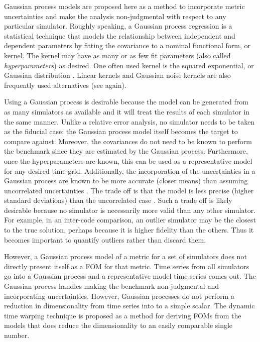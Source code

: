 \documentclass{ntmanuscript}
\begin{document}
Gaussian process models are proposed here as a method to incorporate
metric uncertainties and make the analysis non-judgmental with respect to
any particular
simulator. Roughly speaking, a Gaussian process regression is a
statistical technique
that models the relationship between independent and dependent parameters
by fitting the covariance to a nominal functional form, or kernel.
The kernel may have as many or as few fit parameters (also called
\emph{hyperparameters}) as desired. One often used kernel is the squared
exponential, or Gaussian distribution \cite{rasmussen2006gaussian,hodlr}.
Linear kernels and Gaussian noise kernels are also frequently used
alternatives (see \cite{rasmussen2006gaussian,hodlr} again).

Using a Gaussian process is desirable because the model can be generated
from as many simulators as available and it will treat the results of
each simulator in the same manner. Unlike a relative error analysis, no
simulator needs to be taken as the fiducial case; the Gaussian process model
itself becomes the target to compare against.
Moreover, the covariances do not need to be known to perform the benchmark
since they are estimated by the Gaussian process. Furthermore, once the
hyperparameters are known, this can be used as a representative model for
any desired time grid. Additionally, the incorporation of the uncertainties
in a Gaussian process are known to be more accurate (closer means) than
assuming uncorrelated uncertainties \cite{rasmussen1996evaluation,ko2009gp}.
The trade off is that the model is less precise (higher standard deviations)
than the uncorrelated case \cite{hodlr}. Such a trade off is likely
desirable because no simulator
is necessarily more valid than any other simulator. For example,
in an inter-code comparison, an outlier simulator may be the
closest to the true solution, perhaps because it is higher fidelity than
the others. Thus it becomes important to quantify outliers rather than
discard them.

However, a Gaussian process model of a metric for a set of simulators
does not directly present itself as a FOM for that metric. Time series from
all simulators go into a Gaussian process and a representative model time
series comes out. The Gaussian process handles making the benchmark
non-judgmental and incorporating uncertainties. However, Gaussian processes
do not
perform a reduction in dimensionality from time series into to a simple
scalar. The dynamic time warping
technique is proposed as a method for deriving FOMs from the models that
does reduce the dimensionality to an easily comparable single number.
\end{document}
